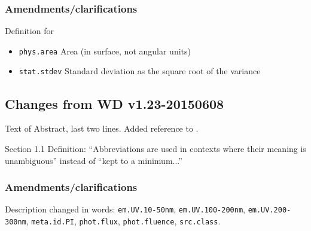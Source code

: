 \documentclass[11pt,a4paper]{ivoa}
\begin{document}
\subsubsection*{Amendments/clarifications}
Definition for 
\begin{itemize}
\item {\tt phys.area} Area (in surface, not angular units)
\item {\tt stat.stdev} Standard deviation as the square root of the variance                                                           
\end{itemize}

\subsection{Changes from WD v1.23-20150608}
Text of Abstract, last two lines. Added reference to \citet{tn:solar-system-ucd}.

Section 1.1 Definition: ``Abbreviations are used in contexts where their meaning is unambiguous'' instead of ``kept to a minimum...''

\subsubsection*{Amendments/clarifications}
\begin{flushleft}
Description changed in words: 
{\tt em.UV.10-50nm}, {\tt em.UV.100-200nm}, {\tt em.UV.200-300nm}, {\tt meta.id.PI}, 
{\tt phot.flux}, {\tt phot.fluence}, {\tt src.class}.
\end{flushleft}
\end{document}
